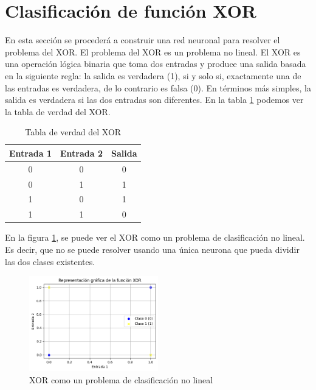 \documentclass{article}
\begin{document}



\newpage
\section{Clasificación de función XOR}

En esta sección se procederá a construir una red neuronal para resolver el problema del XOR. El problema del XOR es un problema no lineal. El XOR es una operación lógica binaria que toma dos entradas y produce una salida basada en la siguiente regla: la salida es verdadera (1), si y solo si, exactamente una de las entradas es verdadera, de lo contrario es falsa (0). En términos más simples, la salida es verdadera si las dos entradas son diferentes. En la tabla \ref{tab:xor_truth_table} podemos ver la tabla de verdad del XOR. 

\begin{table}[h]
\centering
\begin{tabular}{c|c|c}
\hline
\textbf{Entrada 1} & \textbf{Entrada 2} & \textbf{Salida} \\
\hline
0 & 0 & 0 \\
0 & 1 & 1 \\
1 & 0 & 1 \\
1 & 1 & 0 \\
\hline
\end{tabular}
\caption{Tabla de verdad del XOR}
\label{tab:xor_truth_table}
\end{table}

En la figura \ref{fig:xor_plot}, se puede ver el XOR como un problema de clasificación no lineal. Es decir, que no se puede resolver usando una única neurona que pueda dividir las dos clases existentes.

\begin{figure}[htbp]
    \centering
    \includegraphics[width=0.5\textwidth]{imgs/XOR/XOR_grafica.png}
    \caption{XOR como un problema de clasificación no lineal}
    \label{fig:xor_plot}
\end{figure}
\end{document}

